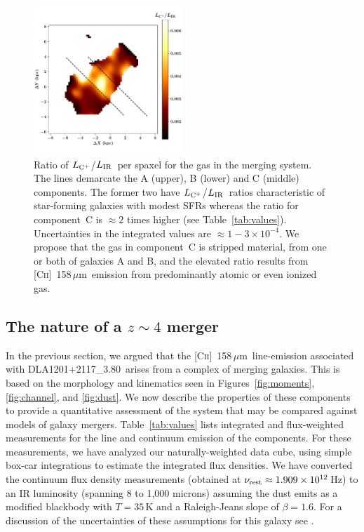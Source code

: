 \documentclass[twocolumn]{aastex62}
\newcommand{\dlaname}{DLA1201+2117\_3.80}
\newcommand{\cplus}{[\ctwo]~158\,$\mu$m}
\newcommand{\mldust}{L_{\rm IR}}  %
\newcommand{\ldust}{$\mldust$}
\newcommand{\mlcplus}{L_{\rm C^+}}   %
\newcommand{\lcplus}{$\mlcplus$}
\newcommand{\ctwo}{C\textsc{ii}}
\begin{document}
\begin{figure}
\centering
\includegraphics[width=0.5\textwidth]{fig_cplus2dust_lines.pdf}
\vspace{-0.3in}
\caption{Ratio of \lcplus/\ldust\ per spaxel for the gas in the merging system.  
The lines demarcate the A (upper), B (lower) and C (middle) components.  The former 
two have \lcplus/\ldust\ ratios characteristic of star-forming galaxies with modest 
SFRs whereas the ratio for component~C is $\approx 2$ times higher (see Table~\ref{tab:values}).  
Uncertainties in the integrated values are $\approx 1-3 \times 10^{-4}$.
We propose that 
the gas in component~C is stripped material, from one or both of galaxies A and B, and 
the elevated ratio results from \cplus\ emission from predominantly atomic or even ionized gas.
}
\label{fig:ratio}
\end{figure}


\subsection{The nature of a $z \sim 4$ merger}

In the previous section, we argued that the \cplus\ line-emission associated with \dlaname\ 
arises from a complex of merging galaxies. This is based on the morphology and kinematics
seen in Figures~\ref{fig:moments}, \ref{fig:channel}, and \ref{fig:dust}.  We now describe the 
properties of these components to provide a quantitative assessment of the system that may 
be compared against models of galaxy mergers. Table~\ref{tab:values} lists integrated and
flux-weighted measurements for the line and continuum emission of the components.  For these 
measurements, we have analyzed our naturally-weighted data cube, using simple box-car integrations 
to estimate the integrated flux densities. We have converted the continuum flux density measurements
(obtained at $\nu_{\rm rest} \approx 1.909 \times 10^{12}$\,Hz) to an IR luminosity (spanning 8 to 1,000 
microns) assuming the dust emits as a modified blackbody with $T = 35$\,K and a Raleigh-Jeans slope of $\beta = 1.6$. For a discussion of the uncertainties of these assumptions for this galaxy see \citet{neeleman+17}.
\end{document}
